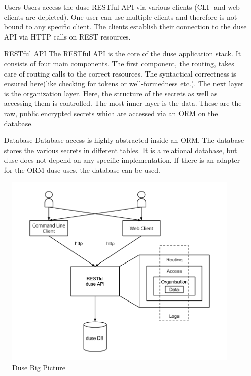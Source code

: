 \begin{enumerate}
  \item[Users] Users access the duse RESTful API via various
  clients (CLI- and web-clients are depicted). One user can use multiple
  clients and therefore is not bound to any specific client. The clients
  establish their connection to the duse API via HTTP calls on REST
  resources.

  \item[RESTful API] The RESTful API is the core of the
  duse application stack. It consists of four main components. The first
  component, the routing, takes care of routing calls to the correct
  resources. The syntactical correctness is ensured here(like checking
  for tokens or well-formedness etc.). The next layer is the organization
  layer. Here, the structure of the secrets as well as accessing them is
  controlled. The most inner layer is the data. These are the raw, public
  encrypted secrets which are accessed via an ORM on the database.

  \item[Database] Database access is highly abstracted inside an
  ORM. The database stores the various secrets in
  different tables. It is a relational database, but duse does not depend
  on any specific implementation. If there is an adapter for the ORM
  duse uses, the database can be used.
\end{enumerate}

\begin{figure}
  \includegraphics[scale=0.55]{pictures/big_picture.png}
  \caption{Duse Big Picture}
  \centering
  \label{fig:big_picture}
\end{figure}

